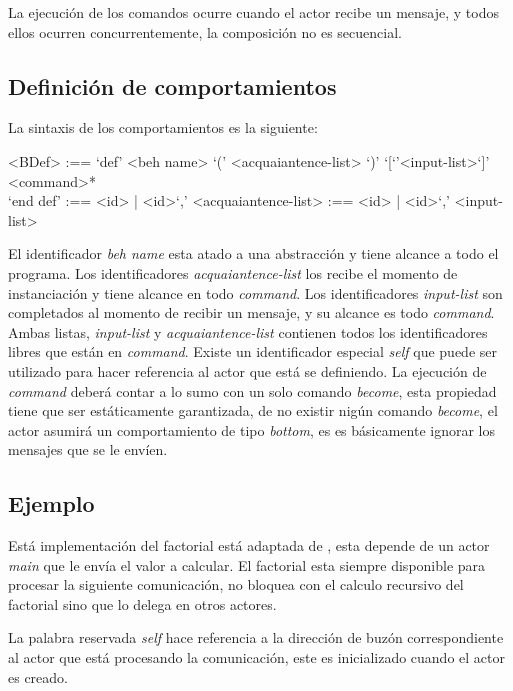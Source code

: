 \documentclass[fleqn]{article}
\begin{document}
La ejecución de los comandos ocurre cuando el actor recibe un mensaje, y todos
ellos ocurren concurrentemente, la composición no es secuencial.

\subsection{Definición de comportamientos}

La sintaxis de los comportamientos es la siguiente:

\begin{grammar}
 <BDef> :== `def' <beh name> `(' <acquaiantence-list> `)' `[`'<input-list>`]' \\
  \quad <command>* \\
  `end def'
   :== <id> | <id>`,' <acquaiantence-list>
   :== <id> | <id>`,' <input-list>
\end{grammar}

El identificador \textit{beh name} esta atado a una abstracción y tiene alcance
a todo el programa. Los identificadores \textit{acquaiantence-list} los recibe el
momento de instanciación y tiene alcance en todo \textit{command}. Los
identificadores \textit{input-list} son completados al momento de recibir un
mensaje, y su alcance es todo \textit{command}.
Ambas listas, \textit{input-list} y \textit{acquaiantence-list} contienen todos
los identificadores libres que están en \textit{command}. Existe un
identificador especial \textit{self} que puede ser utilizado para hacer
referencia al actor que está se definiendo.
La ejecución de \textit{command} deberá contar a lo sumo con un solo comando
\textit{become}, esta propiedad tiene que ser estáticamente garantizada, de no
existir nigún comando \textit{become}, el actor asumirá un comportamiento de
tipo \textit{bottom}, es es básicamente ignorar los mensajes que se le envíen.

\subsection{Ejemplo}

Está implementación del factorial está adaptada de \cite{Agha:1986:AMC:7929}, esta
depende de un actor \textit{main} que le envía el valor a calcular. El factorial
esta siempre disponible para procesar la siguiente comunicación, no bloquea con
el calculo recursivo del factorial sino que lo delega en otros actores.

La palabra reservada \textit{self} hace referencia a la dirección de buzón
correspondiente al actor que está procesando la comunicación, este es inicializado
cuando el actor es creado.
\end{document}

